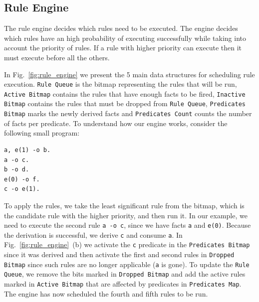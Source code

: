 \subsection{Rule Engine}\label{rule_engine}

The rule engine decides which rules need to be executed. The engine decides which rules have
an high probability of executing successfully while taking into account the priority of rules.
If a rule with higher priority can execute then it must execute before all the others. 

In Fig.~\ref{fig:rule_engine} we present the 5 main data structures for scheduling rule execution.
\texttt{Rule Queue} is the bitmap representing the rules that will be run, \texttt{Active Bitmap} contains the rules that have enough
facts to be fired, \texttt{Inactive Bitmap} contains the rules that must be dropped from \texttt{Rule Queue}, \texttt{Predicates Bitmap}
marks the newly derived facts and \texttt{Predicates Count} counts the number of facts per predicate.
To understand how our engine works, consider
the following small program:

\begin{Verbatim}
a, e(1) -o b.
a -o c.
b -o d.
e(0) -o f.
c -o e(1).
\end{Verbatim}

To apply the rules, we take the least significant rule from the bitmap, which is the candidate rule with the higher priority, and then run it. In our example, we need to execute the second rule \texttt{a -o c}, since we have facts \texttt{a} and \texttt{e(0)}.
Because the derivation is successful, we derive \texttt{c} and consume \texttt{a}. In Fig.~\ref{fig:rule_engine}~(b) we
activate the \texttt{c} predicate in the \texttt{Predicates Bitmap} since it was derived and then activate the first and second rules
in \texttt{Dropped Bitmap} since such rules are no longer applicable (\texttt{a} is gone). To update the \texttt{Rule Queue},
we remove the bits marked in \texttt{Dropped Bitmap} and add the active rules marked in \texttt{Active Bitmap} that are affected
by predicates in \texttt{Predicates Map}. The engine has now scheduled the fourth and fifth rules to be run.

